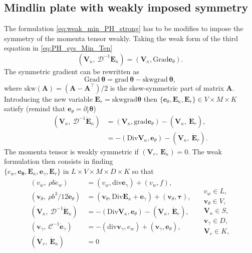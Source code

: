 \documentclass{ifacconf}
\begin{document}
\subsection{Mindlin plate with weakly imposed symmetry}
The formulation \eqref{eq:weak_min_PH_strong} has to be modifies to impose the symmetry of the momenta tensor weakly. Taking the weak form of the third equation in \eqref{eq:PH_sys_Min_Ten}
\[
(\bm{V}_\kappa, \ \mathcal{D}^{-1} \dot{\bm{E}}_\kappa) = (\bm{V}_\kappa, \mathrm{Grad}\bm{e}_\theta ). 
\]
The symmetric gradient can be rewritten as 
\[
\mathrm{Grad}\ \bm{\theta} = \mathrm{grad}\ \bm{\theta} - \mathrm{skw}\mathrm{grad}\ \bm{\theta},
\]
where $\mathrm{skw}(\bm{A})=(\bm{A} - \bm{A}^\top)/2$ is the skew-symmetric part of matrix $\bm{A}$. Introducing the new variable $\bm{E}_r = \mathrm{skw}\mathrm{grad}\bm{\theta}$ then $\{\bm{e}_\theta, \bm{E}_\kappa, \bm{E}_r\} \in V\times M\times K$ satisfy (remind that $\bm{e}_\theta = \partial_t {\bm{\theta}}$)
\begin{equation*}
	\begin{aligned}
	(\bm{V}_\kappa, \ \mathcal{D}^{-1} \dot{\bm{E}}_\kappa) &= (\bm{V}_\kappa, \mathrm{grad}\bm{e}_\theta) - (\bm{V}_\kappa, \ \dot{\bm{E}}_r), \\
	&= -(\mathrm{Div}\bm{V}_\kappa, \bm{e}_\theta) - (\bm{V}_\kappa, \ \dot{\bm{E}}_r).
	\end{aligned}
\end{equation*}
The momenta tensor is weakly symmetric if $(\bm{V}_r, \ \bm{E}_{\kappa}) = 0$. The weak formulation then consists in finding \\
$\{e_w, \bm{e}_{\bm{\theta}}, \bm{E}_{\kappa}, \bm{e}_{\gamma}, \bm{E}_{r}\}$ in $L \times V \times M \times D \times K$ so that 
 \begin{equation}
 \label{eq:weak_min_PH_weak}
 \begin{aligned}
 (v_w, \ \rho b \dot{e}_w) &= (v_w, \mathrm{div} \bm{e}_\gamma) + (v_w, f), \\ 
 (\bm{v}_\theta, \ \rho b^3/12  \dot{\bm{e}}_\theta) &= (\bm{v}_\theta, \mathrm{Div} \bm{E}_\kappa + \bm{e}_\gamma) + (\bm{v}_\theta, \bm{\tau}), \\  
 (\bm{V}_\kappa, \ \mathcal{D}^{-1} \dot{\bm{E}}_\kappa) &= -(\mathrm{Div} \bm{V}_\kappa,  \bm{e}_\theta) - (\bm{V}_\kappa, \ \dot{\bm{E}}_r), \\ 
 (\bm{v}_\gamma, \ \mathcal{C}^{-1} \dot{\bm{e}}_\gamma) &= -(\mathrm{div} \bm{v}_\gamma, e_w ) + (\bm{v}_\gamma, \bm{e}_{\theta}), \\ 
 (\bm{V}_r, \ \dot{\bm{E}}_\kappa) &= 0
 \end{aligned} \quad
 \begin{aligned}
 v_w \in L, \\
 \bm{v}_\theta \in V, \\
 \bm{V}_\kappa \in S, \\
 \bm{v}_\gamma \in D, \\
 \bm{V}_r \in K, \\
 \end{aligned}
 \end{equation}
\end{document}
